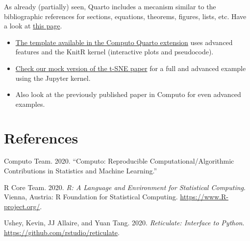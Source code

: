 \documentclass[
  11pt,
  a4paper,
]{article}
\newlength{\cslhangindent}
\newlength{\cslentryspacingunit} %
\newenvironment{CSLReferences}[2] %
 {%
  \setlength{\parindent}{0pt}
  \ifodd #1
  \let\oldpar\par
  \def\par{\hangindent=\cslhangindent\oldpar}
  \fi
  \setlength{\parskip}{#2\cslentryspacingunit}
 }%
 {}
\theoremstyle{plain}
\theoremstyle{remark}
\begin{document}
As already (partially) seen, Quarto includes a mecanism similar to the
bibliographic references for sections, equations, theorems, figures,
lists, etc. Have a look at
\href{https://quarto.org/docs/authoring/cross-references.html}{this
page}.

\begin{tcolorbox}[enhanced jigsaw, colbacktitle=quarto-callout-warning-color!10!white, rightrule=.15mm, opacityback=0, breakable, colback=white, toptitle=1mm, arc=.35mm, opacitybacktitle=0.6, leftrule=.75mm, title=\textcolor{quarto-callout-warning-color}{\faExclamationTriangle}\hspace{0.5em}{For more information}, bottomtitle=1mm, coltitle=black, left=2mm, bottomrule=.15mm, toprule=.15mm, titlerule=0mm]

\begin{itemize}
\item
  \href{https://computo.sfds.asso.fr/published-paper-tsne/}{The template
  available in the Computo Quarto extension} uses advanced features and
  the KnitR kernel (interactive plots and pseudocode).
\item
  \href{https://computo.sfds.asso.fr/published-paper-tsne/}{Check our
  mock version of the t-SNE paper} for a full and advanced example using
  the Jupyter kernel.
\item
  Also look at the previously published paper in Computo for even
  advanced examples.
\end{itemize}

\end{tcolorbox}

\hypertarget{references}{%
\section*{References}\label{references}}

\hypertarget{refs}{}
\begin{CSLReferences}{1}{0}
\leavevmode{}%
Computo Team. 2020. {``Computo: Reproducible Computational/Algorithmic
Contributions in Statistics and Machine Learning.''}

\leavevmode{}%
R Core Team. 2020. \emph{R: A Language and Environment for Statistical
Computing}. Vienna, Austria: R Foundation for Statistical Computing.
\url{https://www.R-project.org/}.

\leavevmode{}%
Ushey, Kevin, JJ Allaire, and Yuan Tang. 2020. \emph{Reticulate:
Interface to Python}. \url{https://github.com/rstudio/reticulate}.

\end{CSLReferences}
\end{document}
